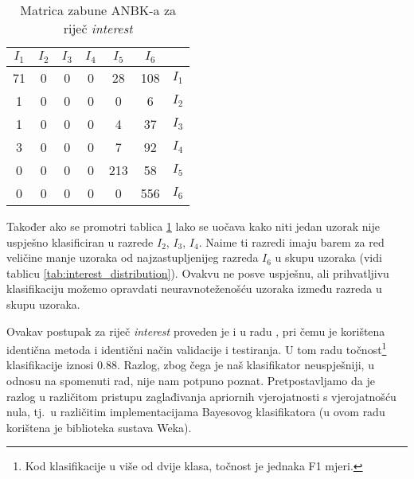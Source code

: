 \documentclass[10pt, a4paper]{article}
\begin{document}
\begin{table}[!hbtp]
\caption{Matrica zabune ANBK-a za riječ \emph{interest}}
\label{tab:interest_confusion_bayes}
\begin{center}
\begin{tabular}{|cccccc|c|}
\hline
$I_1$ & $I_2$ & $I_3$ & $I_4$ & $I_5$ & $I_6$ &  \\
\hline
  71  & 0 &  0 &  0 & 28  & 108 &   $I_1$  \\
   1  & 0 &  0 &  0 &  0  &  6  &   $I_2$  \\
   1  & 0 &  0 &  0 &  4  & 37  &   $I_3$  \\
   3  & 0 &  0 &  0 &  7  & 92  &   $I_4$  \\
   0  & 0 &  0 &  0 & 213 & 58  &   $I_5$  \\
   0  & 0 &  0 &  0 &  0  & 556 &   $I_6$  \\
\hline
\end{tabular}
\end{center}
\end{table}

Također ako se promotri tablica \ref{tab:interest_confusion_bayes} lako se uočava
kako niti jedan uzorak nije uspješno klasificiran u razrede $I_2$, $I_3$, $I_4$.
Naime ti razredi imaju barem za red veličine manje uzoraka od najzastupljenijeg razreda $I_6$
u skupu uzoraka (vidi tablicu \ref{tab:interest_distribution}). Ovakvu ne posve
uspješnu, ali prihvatljivu klasifikaciju možemo opravdati neuravnoteženošću uzoraka
između razreda u skupu uzoraka.

Ovakav postupak za riječ \emph{interest} proveden je i u radu \citep{pedersen}, pri
čemu je korištena identična metoda i identični način validacije i testiranja. 
U tom radu točnost\footnote{Kod klasifikacije u više od dvije klasa, točnost je jednaka F1 mjeri.} klasifikacije iznosi $0.88$. 
Razlog, zbog čega je naš klasifikator neuspješniji, u odnosu na spomenuti rad, nije nam 
potpuno poznat. Pretpostavljamo da je razlog u različitom pristupu zaglađivanja
apriornih vjerojatnosti s vjerojatnošću nula, tj.~u različitim
implementacijama Bayesovog klasifikatora (u ovom radu korištena
je biblioteka sustava Weka). 
\end{document}
